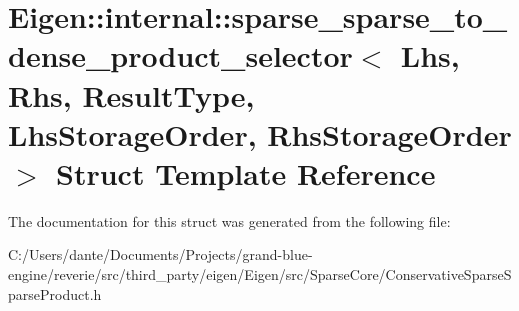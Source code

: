 \hypertarget{struct_eigen_1_1internal_1_1sparse__sparse__to__dense__product__selector}{}\section{Eigen\+::internal\+::sparse\+\_\+sparse\+\_\+to\+\_\+dense\+\_\+product\+\_\+selector$<$ Lhs, Rhs, Result\+Type, Lhs\+Storage\+Order, Rhs\+Storage\+Order $>$ Struct Template Reference}
\label{struct_eigen_1_1internal_1_1sparse__sparse__to__dense__product__selector}


The documentation for this struct was generated from the following file\+:\begin{DoxyCompactItemize}
\item 
C\+:/\+Users/dante/\+Documents/\+Projects/grand-\/blue-\/engine/reverie/src/third\+\_\+party/eigen/\+Eigen/src/\+Sparse\+Core/Conservative\+Sparse\+Sparse\+Product.\+h\end{DoxyCompactItemize}
